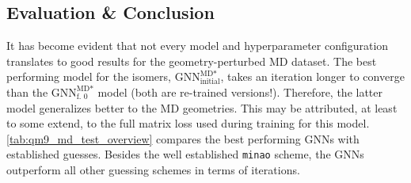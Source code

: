 \subsection{Evaluation \& Conclusion}
\label{sec:qm9_md_isomers_conclusion}
It has become evident that not every model and hyperparameter configuration translates to good results for the geometry-perturbed MD dataset. The best performing model for the isomers, $\text{GNN}^{\text{MD*}}_\text{initial}$, takes an iteration longer to converge than the $\text{GNN}^{\text{MD*}}_\text{f. 0}$ model (both are re-trained versions!). Therefore, the latter model generalizes better to the MD geometries. This may be attributed, at least to some extend, to the full matrix loss used during training for this model. \autoref{tab:qm9_md_test_overview} compares the best performing GNNs with established guesses. Besides the well established \texttt{minao} scheme, the GNNs outperform all other guessing schemes in terms of iterations. 
